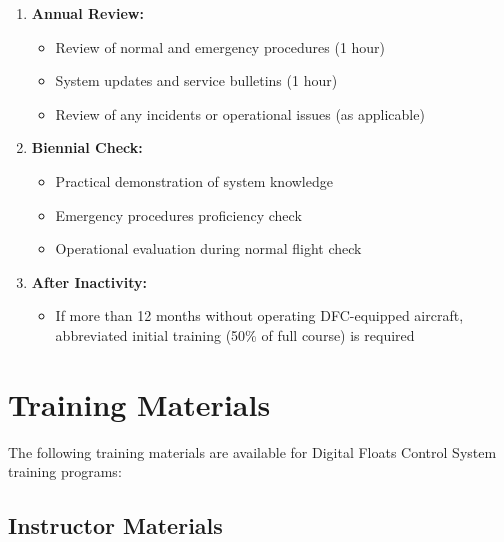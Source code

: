 \documentclass[12pt,a4paper,twoside,openright]{book}
\begin{document}
\begin{enumerate}
    \item \textbf{Annual Review:}
    \begin{itemize}
        \item Review of normal and emergency procedures (1 hour)
        \item System updates and service bulletins (1 hour)
        \item Review of any incidents or operational issues (as applicable)
    \end{itemize}
    
    \item \textbf{Biennial Check:}
    \begin{itemize}
        \item Practical demonstration of system knowledge
        \item Emergency procedures proficiency check
        \item Operational evaluation during normal flight check
    \end{itemize}
    
    \item \textbf{After Inactivity:}
    \begin{itemize}
        \item If more than 12 months without operating DFC-equipped aircraft, abbreviated initial training (50\% of full course) is required
    \end{itemize}
\end{enumerate}

\section{Training Materials}

The following training materials are available for Digital Floats Control System training programs:

\subsection{Instructor Materials}
\end{document}
